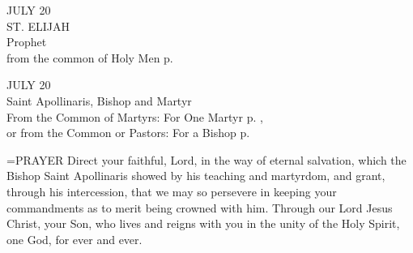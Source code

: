 \begin{center}\normalsize JULY 20\\
\footnotesize ST. ELIJAH\\
\footnotesize Prophet\\
\footnotesize from the common of Holy Men p. \\
\end{center}

\begin{center}\normalsize JULY 20\\
\footnotesize Saint Apollinaris, Bishop and Martyr\\
\footnotesize From the Common of Martyrs: For One Martyr p.   , \\
\footnotesize or from the Common or Pastors: For a Bishop p.\\
\end{center}

\hangindent=\parindent \small{PRAYER 
Direct your faithful, Lord, in the way of eternal salvation,
which the Bishop Saint Apollinaris showed by his teaching and martyrdom,
and grant, through his intercession,
that we may so persevere in keeping your commandments
as to merit being crowned with him.
Through our Lord Jesus Christ, your Son,
who lives and reigns with you in the unity of the Holy Spirit,
one God, for ever and ever.\\}
 
